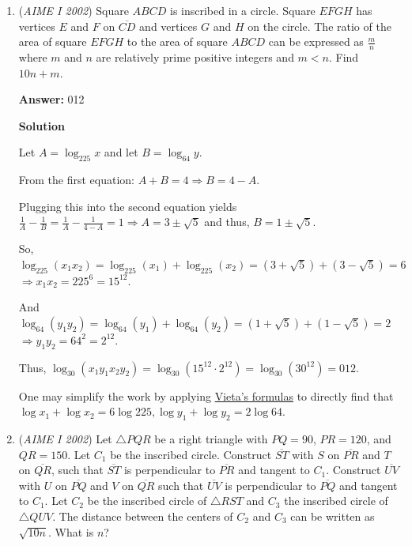 \begin{enumerate}
 Case 2: Squares with exactly four vertices from the set.By simply counting all of them, we get a total of 3: the squares formed by $(A_1, A_4, A_7, A_{10})$, $(A_2, A_5, A_8, A_{11})$, and $(A_3, A_6, A_9, A_{12})$. For each of these squares, there are $\binom{4}{2} = 6$ ways it could have been counted in the original 198 squares. So, we must subtract $6\cdot 3 = 18$ from that. We get 180. But now, we don't have any of these squares in the count! We must add these 3 squares back, to get $180 + 3 = \boxed{183}$.

 


	\item (\textit{AIME I 2002}) Square $ABCD$ is inscribed in a circle. Square $EFGH$ has vertices $E$ and $F$ on $\overline{CD}$ and vertices $G$ and $H$ on the circle. The ratio of the area of square $EFGH$ to the area of square $ABCD$ can be expressed as $\frac {m}{n}$ where $m$ and $n$ are relatively prime positive integers and $m < n$. Find $10n + m$.


 
 \textbf{Answer: }012



\textbf{Solution}

Let $A=\log_{225}x$ and let $B=\log_{64}y$. 

 From the first equation: $A+B=4 \Rightarrow B = 4-A$. 

 Plugging this into the second equation yields $\frac{1}{A}-\frac{1}{B}=\frac{1}{A}-\frac{1}{4-A}=1 \Rightarrow A = 3\pm\sqrt{5}$ and thus, $B=1\pm\sqrt{5}$. 

 So, $\log_{225}(x_1x_2)=\log_{225}(x_1)+\log_{225}(x_2)=(3+\sqrt{5})+(3-\sqrt{5})=6$ $\Rightarrow x_1x_2=225^6=15^{12}$. 

 And $\log_{64}(y_1y_2)=\log_{64}(y_1)+\log_{64}(y_2)=(1+\sqrt{5})+(1-\sqrt{5})=2$ $\Rightarrow y_1y_2=64^2=2^{12}$. 

 Thus, $\log_{30}\left(x_1y_1x_2y_2\right) = \log_{30}\left(15^{12}\cdot2^{12} \right) = \log_{30}\left(30^{12} \right) = \boxed{012}$. 

 
One may simplify the work by applying \href{https://artofproblemsolving.com/wiki/index.php?title=Vieta\%27s\_formulas}{Vieta's formulas} to directly find that $\log x_1 + \log x_2 = 6 \log 225, \log y_1 + \log y_2 = 2 \log 64$.

 


	\item (\textit{AIME I 2002}) Let $\triangle{PQR}$ be a right triangle with $PQ = 90$, $PR = 120$, and $QR = 150$. Let $C_{1}$ be the inscribed circle. Construct $\overline{ST}$ with $S$ on $\overline{PR}$ and $T$ on $\overline{QR}$, such that $\overline{ST}$ is perpendicular to $\overline{PR}$ and tangent to $C_{1}$. Construct $\overline{UV}$ with $U$ on $\overline{PQ}$ and $V$ on $\overline{QR}$ such that $\overline{UV}$ is perpendicular to $\overline{PQ}$ and tangent to $C_{1}$. Let $C_{2}$ be the inscribed circle of $\triangle{RST}$ and $C_{3}$ the inscribed circle of $\triangle{QUV}$. The distance between the centers of $C_{2}$ and $C_{3}$ can be written as $\sqrt {10n}$. What is $n$?



\end{enumerate}
